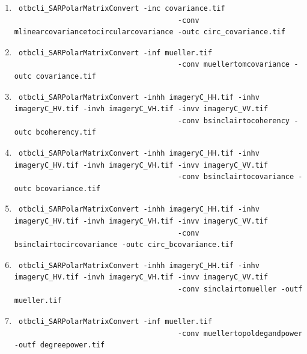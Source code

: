 \begin{enumerate}
\item \begin{verbatim} otbcli_SARPolarMatrixConvert -inc covariance.tif 
									  -conv mlinearcovariancetocircularcovariance -outc circ_covariance.tif \end{verbatim}	
									  			
\item \begin{verbatim} otbcli_SARPolarMatrixConvert -inf mueller.tif 
									  -conv muellertomcovariance -outc covariance.tif \end{verbatim}	
									  								  
\item \begin{verbatim} otbcli_SARPolarMatrixConvert -inhh imageryC_HH.tif -inhv imageryC_HV.tif -invh imageryC_VH.tif -invv imageryC_VV.tif
									  -conv bsinclairtocoherency -outc bcoherency.tif \end{verbatim}
									  
\item \begin{verbatim} otbcli_SARPolarMatrixConvert -inhh imageryC_HH.tif -inhv imageryC_HV.tif -invh imageryC_VH.tif -invv imageryC_VV.tif 
									  -conv bsinclairtocovariance -outc bcovariance.tif \end{verbatim}
									  
\item \begin{verbatim} otbcli_SARPolarMatrixConvert -inhh imageryC_HH.tif -inhv imageryC_HV.tif -invh imageryC_VH.tif -invv imageryC_VV.tif
									  -conv bsinclairtocircovariance -outc circ_bcovariance.tif \end{verbatim}
									  
									  
\item \begin{verbatim} otbcli_SARPolarMatrixConvert -inhh imageryC_HH.tif -inhv imageryC_HV.tif -invh imageryC_VH.tif -invv imageryC_VV.tif 
									  -conv sinclairtomueller -outf mueller.tif \end{verbatim}
									  
\item \begin{verbatim} otbcli_SARPolarMatrixConvert -inf mueller.tif 
									  -conv muellertopoldegandpower -outf degreepower.tif \end{verbatim}
									  
\end{enumerate}

